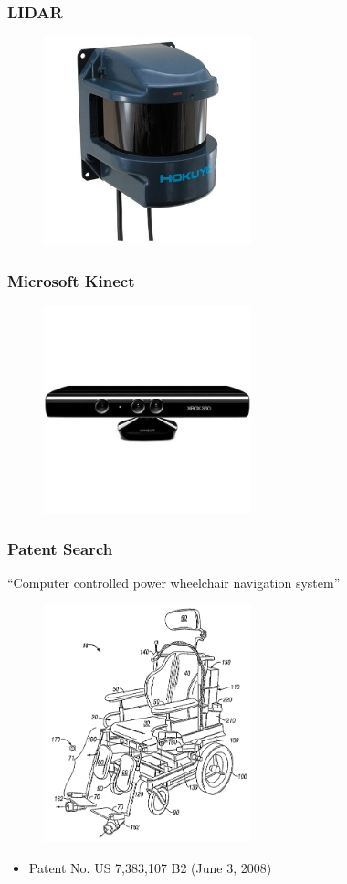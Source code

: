 \documentclass{beamer}
\begin{document}
\begin{frame}
  \frametitle{LIDAR}
  \begin{figure}
    \centering
    \includegraphics[width=6cm]{laser.jpg}
  \end{figure}
\end{frame}

\begin{frame}
  \frametitle{Microsoft Kinect}
  \begin{figure}
    \centering
    \includegraphics[width=6cm]{Kinect.jpg}
  \end{figure}
\end{frame}

\begin{frame}
  \frametitle{Patent Search}
  ``Computer controlled power wheelchair navigation system''
  \begin{figure}
    \centering
    \includegraphics[width=6cm]{patents.png}
  \end{figure}
  \begin{itemize}
    \item Patent No. US 7,383,107 B2 (June 3, 2008) \\
  \end{itemize}
\end{frame}
\end{document}
